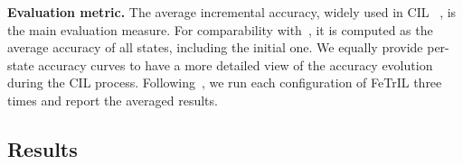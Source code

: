 \documentclass[10pt,twocolumn,letterpaper]{article}
\makeatletter
\newcommand{\ourmodel}{FeTrIL\@\xspace}
\makeatother
\begin{document}
\textbf{Evaluation metric.} The average incremental accuracy, widely used in CIL ~\cite{masana2021_study,rebuffi2017_icarl}, is the main evaluation measure.
For comparability with~\cite{zhu2021class,zhu2021pass,zhu2022self}, it is computed as the average accuracy of all states, including the initial one. 
We equally provide per-state accuracy curves to have a more detailed view of the accuracy evolution during the CIL process. 
Following~\cite{zhu2022self}, we run each configuration of \ourmodel three times and report the averaged results.

\subsection{Results}
\label{subsec:results}

\begin{table*}[t]
\begin{center}
\end{center}
\end{table*}
\end{document}
